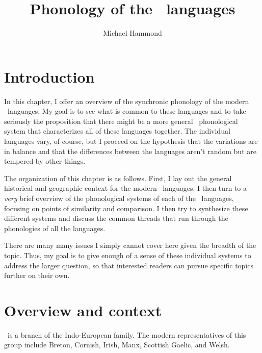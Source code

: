\documentclass[output=paper,colorlinks,citecolor=brown]{langscibook}
\author{Michael Hammond\orcid{}\affiliation{University of Arizona}}
\title{Phonology of the \ce\ languages}
\begin{document}
\maketitle


\section{Introduction}

In this chapter, I offer an overview of the synchronic phonology of the modern \ce\ languages. My goal is to see what is common to these languages and to take seriously the proposition that there might be a more general \ce\ phonological system that characterizes all of these languages together. The individual languages vary, of course, but I proceed on the hypothesis that the variations are in balance and that the differences between the languages aren't random but are tempered by other things.

The organization of this chapter is as follows. First, I lay out the general historical and geographic context for the modern \ce\ languages. I then turn to a \emph{very} brief overview of the phonological systems of each of the \ce\ languages, focusing on points of similarity and comparison. I then try to synthesize these different systems and discuss the common threads that run through the phonologies of all the languages.

There are many many issues I simply cannot cover here given the breadth of the topic. Thus, my goal is to give enough of a sense of these individual systems to address the larger question, so that interested readers can pursue specific topics further on their own.

\section{Overview and context}

\ce\ is a branch of the Indo-European family. The modern representatives of this group include Breton, Cornish, Irish, Manx, Scottish Gaelic, and Welsh. 
\end{document}
